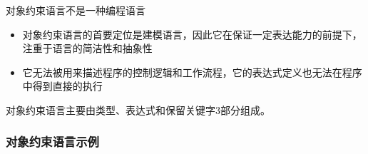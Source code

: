 对象约束语言不是一种编程语言
\begin{itemize}
    \item 对象约束语言的首要定位是建模语言，因此它在保证一定表达能力的前提下，注重于语言的简洁性和抽象性
    \item 它无法被用来描述程序的控制逻辑和工作流程，它的表达式定义也无法在程序中得到直接的执行
\end{itemize}

对象约束语言主要由类型、表达式和保留关键字3部分组成。

\subsubsection{对象约束语言示例}
\begin{figure}[H]
	\setcounter{subfigure}{0}
	\centering
	\vspace{-0.5em}	
    \hfill
\end{figure}
